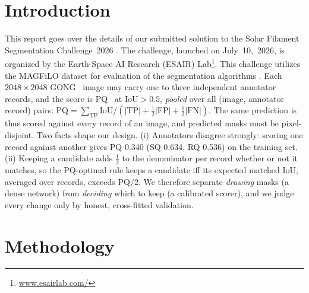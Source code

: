 \documentclass[sigconf]{acmart}
\begin{document}
\section{Introduction}
    This report goes over the details of our submitted solution to the Solar Filament Segmentation Challenge~2026 \cite{filament-segmentation-2026}. The challenge, launched on July~10,~2026, is organized by the Earth-Space AI Research (ESAIR) Lab\footnote{\href{https://www.esairlab.com/home}{www.esairlab.com/}}. This challenge utilizes the MAGFiLO dataset for evaluation of the segmentation algorithms \cite{ahmadzadeh2024dataset}. Each $2048{\times}2048$ GONG~\cite{harvey1996gong} image may carry one to three independent annotator records, and the score is PQ~\cite{kirillov2019panoptic} at IoU${>}0.5$, \emph{pooled} over all (image, annotator record) pairs: $\mathrm{PQ}=\sum_{\mathrm{TP}}\mathrm{IoU}/(|\mathrm{TP}|+\tfrac12|\mathrm{FP}|+\tfrac12|\mathrm{FN}|)$. The same prediction is thus scored against every record of an image, and predicted masks must be pixel-disjoint.
    Two facts shape our design. (i) Annotators disagree strongly: scoring one record against another gives PQ 0.340 (SQ 0.634, RQ 0.536) on the training set. (ii) Keeping a candidate adds $\tfrac12$ to the denominator per record whether or not it matches, so the PQ-optimal rule keeps a candidate iff its expected matched IoU, averaged over records, exceeds $\mathrm{PQ}/2$. We therefore separate \emph{drawing} masks (a dense network) from \emph{deciding} which to keep (a calibrated scorer), and we judge every change only by honest, cross-fitted validation.

\section{Methodology}\label{sec:methodology}
\end{document}
